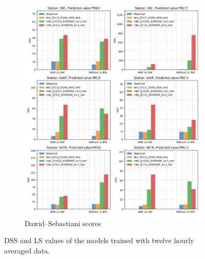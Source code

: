 \documentclass[12pt,a4paper,twoside]{scrartcl}
\numberwithin{equation}{section}
\newcounter{mypagecount}%
\newenvironment{interlude}{%
  \clearpage
  \setcounter{mypagecount}{\value{page}}%
  \thispagestyle{empty}%
  \pagestyle{empty}%
}{%
  \clearpage
  \setcounter{page}{\value{mypagecount}}%
}
\begin{document}
\begin{interlude}
\begin{appendices}
\begin{figure}[h!]
\begin{subfigure}[t]{0.49\textwidth}
        \includegraphics[width=\textwidth,height=1.2\textwidth]{figures/figs_12h/results_plot_DSS}%
        \caption{Dawid–Sebastiani scores}
      \end{subfigure}
      \caption[DSS and LS of the models (twelve hourly averaged data)]{DSS and LS values of the models trained with twelve hourly averaged data.}
    \end{figure}
    \begin{figure}[h!]
      \centering
      \begin{subfigure}[t]{0.49\textwidth}

\end{subfigure}
\end{figure}
\end{appendices}
\end{interlude}
\end{document}
